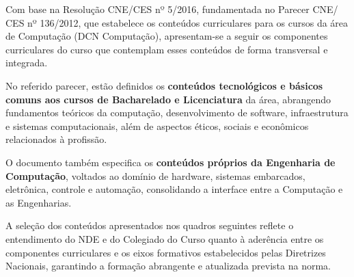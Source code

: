 Com base na Resolução CNE/CES nº 5/2016, fundamentada no Parecer CNE/ CES nº 136/2012, que estabelece os conteúdos curriculares para os cursos da área de Computação (DCN Computação), apresentam-se a seguir os componentes curriculares do curso que contemplam esses conteúdos de forma transversal e integrada.

No referido parecer, estão definidos os \textbf{conteúdos tecnológicos e básicos comuns aos cursos de Bacharelado e Licenciatura} da área, abrangendo fundamentos teóricos da computação, desenvolvimento de software, infraestrutura e sistemas computacionais, além de aspectos éticos, sociais e econômicos relacionados à profissão.

O documento também especifica os \textbf{conteúdos próprios da Engenharia de Computação}, voltados ao domínio de hardware, sistemas embarcados, eletrônica, controle e automação, consolidando a interface entre a Computação e as Engenharias.

A seleção dos conteúdos apresentados nos quadros seguintes reflete o entendimento do NDE e do Colegiado do Curso quanto à aderência entre os componentes curriculares e os eixos formativos estabelecidos pelas Diretrizes Nacionais, garantindo a formação abrangente e atualizada prevista na norma.




